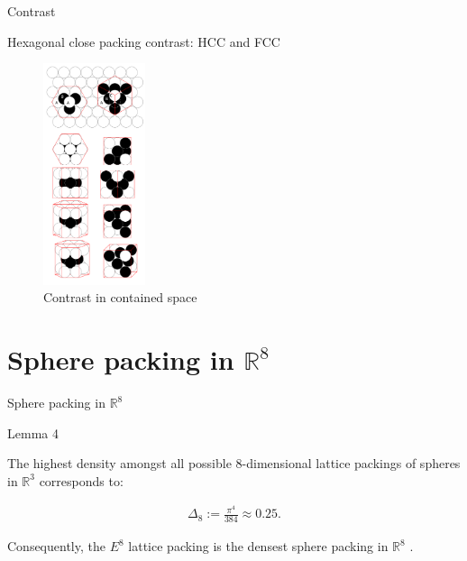 \documentclass[10pt]{beamer}
\begin{document}
\begin{frame}{Contrast}
    \begin{block}{Hexagonal close packing contrast: HCC and FCC}

    
    \begin{figure}[t]
    \includegraphics[width=3cm,  angle =90]{contrast.png}
    \centering
    \caption{Contrast in contained space}
    \end{figure}
    \end{block}
\end{frame}
    

\section{Sphere packing in $\mathbb{R}^8$}
\begin{frame}{Sphere packing in $\mathbb{R}^8$}

\begin{block}{Lemma 4}
    
    The highest density amongst all possible $8$-dimensional lattice packings of spheres in $\mathbb{R}^3$ corresponds to: 

  \begin{equation} \label{6.4}
    \begin{split}
        \Delta_8 := \frac{\pi^4}{384} \approx 0.25.
    \end{split}
    \end{equation}
    
    Consequently, the $E^8$ lattice packing is the densest sphere packing in $\mathbb{R}^8$ \cite{viazovska2017sphere}.
    
    \end{block}
    
    

\end{frame}
\end{document}

